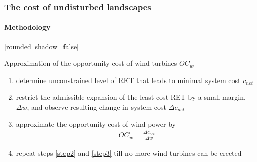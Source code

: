 \documentclass[aspectratio=1610, xcolor=dvipsnames]{beamer}
\begin{document}
    \begin{frame}
        \frametitle{The cost of undisturbed landscapes}
        \framesubtitle{Methodology}

        \medskip
        {%
            [rounded][shadow=false]
            \begin{block}{Approximation of the opportunity cost of wind turbines $OC_w$}
                \begin{enumerate}
                    \item determine unconstrained level of RET that leads to minimal system cost $c_{net}$ \label{step1}
                    \item restrict the admissible expansion of the least-cost RET by a small margin, $\Delta w$, and observe
                    resulting change in system cost $\Delta c_{net}$ \label{step2}
                    \item approximate the opportunity cost of wind power by \label{step3}
                    \begin{align*}
                        OC_w = \frac{\Delta c_{net}}{\Delta w}
                    \end{align*}
                    \item repeat steps \ref{step2} and \ref{step3} till no more wind turbines can be erected
                \end{enumerate}
            \end{block}
        }%
    \end{frame}
\end{document}
